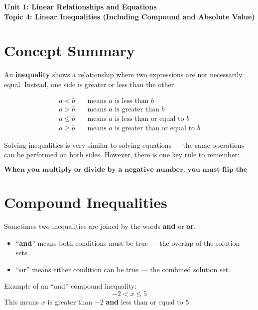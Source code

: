 \documentclass[14pt]{extarticle}
\renewcommand{\emph}[1]{\textbf{#1}}
\begin{document}
\raggedright
{}

\begin{center}
    \LARGE \textbf{Unit 1: Linear Relationships and Equations} \\[6pt]
    \Large \textbf{Topic 4: Linear Inequalities (Including Compound and Absolute Value)}
\end{center}

\vspace{1em}

\section*{Concept Summary}

An \textbf{inequality} shows a relationship where two expressions are not necessarily equal.  
Instead, one side is greater or less than the other.

\[
\begin{aligned}
a < b &\quad \text{means } a \text{ is less than } b \\
a > b &\quad \text{means } a \text{ is greater than } b \\
a \leq b &\quad \text{means } a \text{ is less than or equal to } b \\
a \geq b &\quad \text{means } a \text{ is greater than or equal to } b
\end{aligned}
\]

Solving inequalities is very similar to solving equations — the same operations can be performed on both sides.  
However, there is one key rule to remember:

\[
\textbf{When you multiply or divide by a negative number, you must flip the inequality sign.}
\]

\section*{Compound Inequalities}

Sometimes two inequalities are joined by the words \textbf{and} or \textbf{or}.

\begin{itemize}
    \item “\textbf{and}” means both conditions must be true — the overlap of the solution sets.
    \item “\textbf{or}” means either condition can be true — the combined solution set.
\end{itemize}

Example of an “and” compound inequality:
\[
-2 < x \leq 5
\]
This means \(x\) is greater than \(-2\) \emph{and} less than or equal to \(5\).
\end{document}
